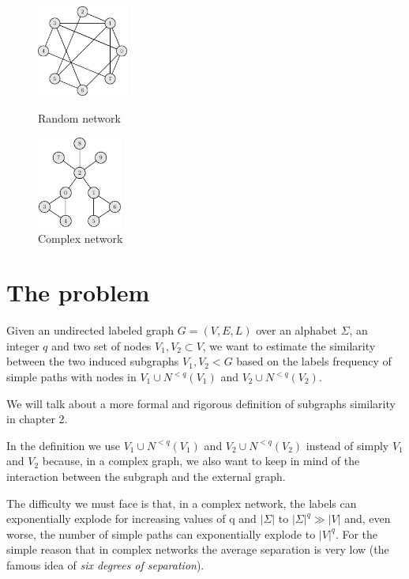 \begin{figure}[h]
	\centering
	\begin{minipage}[t]{.45\textwidth}
		\centering
		\includegraphics[width=3cm,height=3cm]{figure/figure-1-3}
		\caption{Random network}
	\end{minipage}\hfill
	\begin{minipage}[t]{.45\textwidth}
		\centering
		\includegraphics[width=2.8cm,height=3cm]{figure/figure-1-4}
		\caption{Complex network}
	\end{minipage}
\end{figure}

\section{The problem}

\begin{problema}
	Given an undirected labeled graph $G=(V,E,L)$ over an alphabet $\Sigma$, an integer $q$
	and two set of nodes $V_{1}, V_{2} \subset V$, we want to estimate the similarity between the two induced subgraphs $V_{1}, V_{2} < G$ based on the labels frequency of simple paths with nodes in $V_{1} \cup N^{<q}(V_{1})$ and $V_{2} \cup N^{<q}(V_{2})$.
\end{problema}

We will talk about a more formal and rigorous definition of subgraphs similarity in chapter 2.\medskip

In the definition we use $V_{1} \cup N^{<q}(V_{1})$ and $V_{2} \cup N^{<q}(V_{2})$ instead of simply $V_{1}$ and $V_{2}$ because, in a complex graph, we also want to keep in mind of the interaction between the subgraph and the external graph.\medskip

The difficulty we must face is that, in a complex network, the labels can exponentially explode for increasing values of q and $|\Sigma|$ to $|\Sigma|^{q} \gg |V|$ and, even worse, the number of simple paths can exponentially explode to $|V|^{q}$. For the simple reason that in complex networks the average separation is very low (the famous idea of \textit{six degrees of separation}).\medskip

